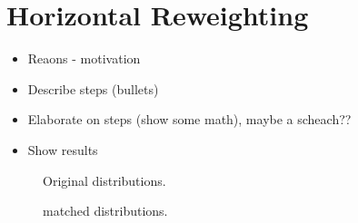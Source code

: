 
\chapter{Horizontal Reweighting}
\label{AppendixB}

\begin{itemize}
  \item Reaons - motivation
  \item Describe steps (bullets)
  \item Elaborate on steps (show some math), maybe a scheach??
  \item Show results
\end{itemize}


\begin{figure}[t]
  \centering
  \begin{subfigure}{0.5\textwidth}
    \raggedright
    \scalebox{1.15}{}
    \caption{}
    \label{kplus_rew_original}
  \end{subfigure}%
  \hfill
  \begin{subfigure}{0.5\textwidth}
    \raggedleft
    \scalebox{1.15}{}
    \caption{}
    \label{pminus_rew_original}
  \end{subfigure}
  \caption{ Original distributions.}
  \label{rew_original}
\end{figure}


\begin{figure}[t]
  \centering
  \begin{subfigure}{0.5\textwidth}
    \raggedright
    \scalebox{1.15}{}
    \caption{}
    \label{kplus_rew_matched}
  \end{subfigure}%
  \hfill
  \begin{subfigure}{0.5\textwidth}
    \raggedleft
    \scalebox{1.15}{}
    \caption{}
    \label{pminus_rew_matched}
  \end{subfigure}
  \caption{ matched distributions.}
  \label{rew_matched}
\end{figure}
